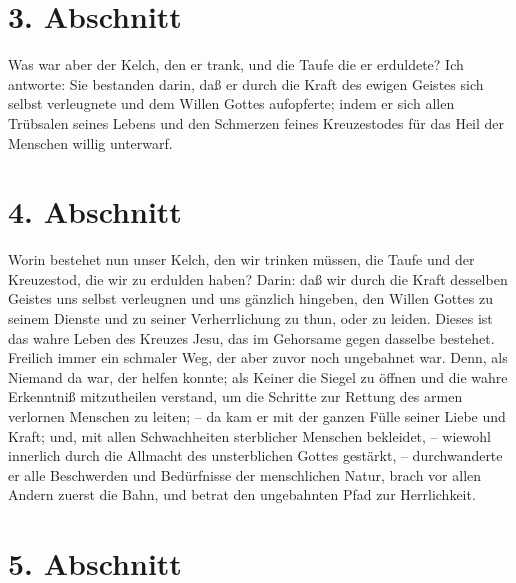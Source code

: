 \section{3. Abschnitt}

Was war aber der Kelch, den er trank, und die Taufe die er erduldete? Ich
antworte: Sie bestanden darin, daß er durch die Kraft des ewigen Geistes sich
selbst verleugnete und dem Willen Gottes aufopferte; indem er sich allen
Trübsalen seines Lebens und den Schmerzen feines Kreuzestodes für das Heil der
Menschen willig unterwarf.

\section{4. Abschnitt}

Worin bestehet nun unser Kelch, den wir trinken müssen, die Taufe und der
Kreuzestod, die wir zu erdulden haben? Darin: daß wir durch die Kraft desselben
Geistes uns selbst verleugnen und uns gänzlich hingeben, den Willen Gottes zu
seinem Dienste und zu seiner Verherrlichung zu thun, oder zu leiden. Dieses ist
das wahre Leben des Kreuzes Jesu, das im Gehorsame gegen dasselbe bestehet.
Freilich immer ein schmaler Weg, der aber zuvor noch ungebahnet war. Denn, als
Niemand da war, der helfen konnte; als Keiner die Siegel zu öffnen und die wahre
Erkenntniß mitzutheilen verstand, um die Schritte zur Rettung des armen
verlornen Menschen zu leiten; -- da kam er mit der ganzen Fülle seiner Liebe und
Kraft; und, mit allen Schwachheiten sterblicher Menschen bekleidet, -- wiewohl
innerlich durch die Allmacht des unsterblichen Gottes gestärkt, -- durchwanderte
er alle Beschwerden und Bedürfnisse der menschlichen Natur, brach vor allen
Andern zuerst die Bahn, und betrat den ungebahnten Pfad zur Herrlichkeit.

\section{5. Abschnitt}

